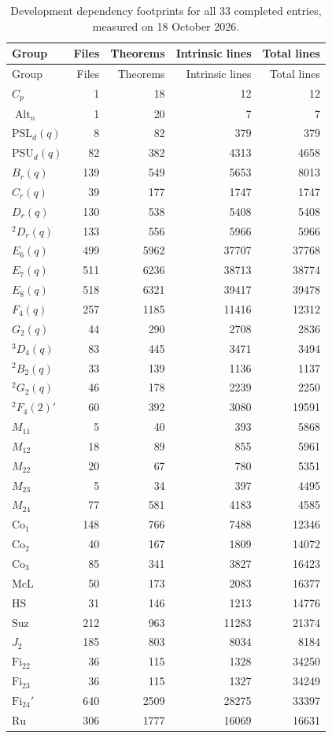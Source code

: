 \documentclass[11pt]{article}
\numberwithin{equation}{section}
\theoremstyle{definition}
\newcommand{\PSL}{\mathrm{PSL}}
\newcommand{\PSU}{\mathrm{PSU}}
\newcommand{\Alt}{\operatorname{Alt}}
\newcommand{\Co}{\mathrm{Co}}
\newcommand{\Fi}{\mathrm{Fi}}
\newcommand{\Suz}{\mathrm{Suz}}
\begin{document}
\begingroup\small
\begin{longtable}{@{}lrrrr@{}}
\caption{Development dependency footprints for all 33 completed entries,
measured on 18 October 2026.}\label{tab:current-footprints}\\
\toprule Group & Files & Theorems & Intrinsic lines & Total lines\\\midrule
\endfirsthead
\toprule Group & Files & Theorems & Intrinsic lines & Total lines\\\midrule
\endhead
$C_p$ & 1 & 18 & 12 & 12\\
$\Alt_n$ & 1 & 20 & 7 & 7\\
$\PSL_d(q)$ & 8 & 82 & 379 & 379\\
$\PSU_d(q)$ & 82 & 382 & 4313 & 4658\\
$B_r(q)$ & 139 & 549 & 5653 & 8013\\
$C_r(q)$ & 39 & 177 & 1747 & 1747\\
$D_r(q)$ & 130 & 538 & 5408 & 5408\\
${}^2D_r(q)$ & 133 & 556 & 5966 & 5966\\
$E_6(q)$ & 499 & 5962 & 37707 & 37768\\
$E_7(q)$ & 511 & 6236 & 38713 & 38774\\
$E_8(q)$ & 518 & 6321 & 39417 & 39478\\
$F_4(q)$ & 257 & 1185 & 11416 & 12312\\
$G_2(q)$ & 44 & 290 & 2708 & 2836\\
${}^3D_4(q)$ & 83 & 445 & 3471 & 3494\\
${}^2B_2(q)$ & 33 & 139 & 1136 & 1137\\
${}^2G_2(q)$ & 46 & 178 & 2239 & 2250\\
${}^2F_4(2)'$ & 60 & 392 & 3080 & 19591\\
$M_{11}$ & 5 & 40 & 393 & 5868\\
$M_{12}$ & 18 & 89 & 855 & 5961\\
$M_{22}$ & 20 & 67 & 780 & 5351\\
$M_{23}$ & 5 & 34 & 397 & 4495\\
$M_{24}$ & 77 & 581 & 4183 & 4585\\
$\Co_1$ & 148 & 766 & 7488 & 12346\\
$\Co_2$ & 40 & 167 & 1809 & 14072\\
$\Co_3$ & 85 & 341 & 3827 & 16423\\
$\mathrm{McL}$ & 50 & 173 & 2083 & 16377\\
$\mathrm{HS}$ & 31 & 146 & 1213 & 14776\\
$\Suz$ & 212 & 963 & 11283 & 21374\\
$J_2$ & 185 & 803 & 8034 & 8184\\
$\Fi_{22}$ & 36 & 115 & 1328 & 34250\\
$\Fi_{23}$ & 36 & 115 & 1327 & 34249\\
$\Fi_{24}'$ & 640 & 2509 & 28275 & 33397\\
$\mathrm{Ru}$ & 306 & 1777 & 16069 & 16631\\
\bottomrule
\end{longtable}
\endgroup
\end{document}
